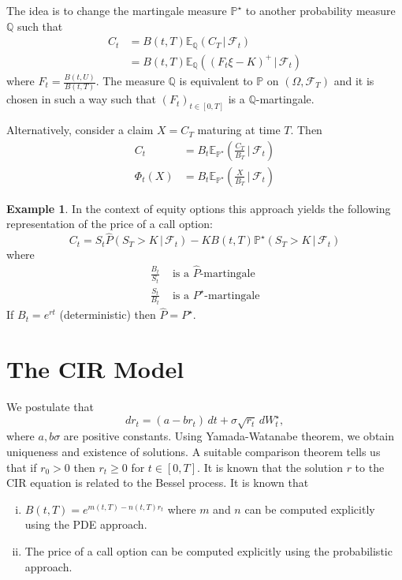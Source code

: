 \documentclass[10pt, oneside, reqno]{amsbook}
\theoremstyle{plain}%
\theoremstyle{definition}
\newtheorem{exmp}[thm]{Example}
\theoremstyle{remark}
\newcommand{\given}{ \, | \,}
\newcommand{\sigf}{\mathcal{F}}
\newcommand{\Q}{\mathbb{Q}}
\newcommand{\E}{\mathbb{E}}
\renewcommand{\P}{\mathbb{P}}
\numberwithin{equation}{chapter}
\begin{document}
The idea is to change the martingale measure $\P^\star$ to another probability measure $\Q$ such that \begin{align*}
    C_t &= B(t, T) \E_{\Q} \left(C_T \given \sigf_t \right) \\
    &= B(t, T) \E_{\Q} \left( \left(F_t \xi - K \right)^+ \given \sigf_t \right)
\end{align*} where $F_t = \frac{B(t, U)}{B(t, T)}$.  The measure $\Q$ is equivalent to $\P$ on $(\Omega, \sigf_T)$ and it is chosen in such a way such that $(F_t)_{t \in [0, T]}$ is a $\Q$-martingale.


Alternatively, consider a claim $X = C_T$ maturing at time $T$.  Then \begin{align*}
    C_t &= B_t \E_{\P^\star} \left( \frac{C_T}{B_T} \given \sigf_t \right) \\
    \Phi_t(X) &= B_t \E_{\P^\star} \left( \frac{X}{B_T} \given \sigf_t \right)
\end{align*}
\begin{exmp}
    In the context of equity options this approach yields the following representation of the price of a call option: \[
        C_t = S_t \hat P \left(S_T > K \given \sigf_t \right) - K B(t, T) \P^\star \left( S_T > K \given \sigf_t \right)
    \] 
    where \begin{align*}
        \frac{B_t}{S_t} &\text{ is a $\hat P$-martingale} \\
        \frac{S_t}{B_t} &\text{ is a $P^\star$-martingale}
    \end{align*}  If $B_t = e^{rt}$ (deterministic) then $\hat P =  P^\star$.
\end{exmp}

\section{The CIR Model} %
\label{sub:the_cir}
We postulate that \[
    dr_t = (a- b r_t) \, dt + \sigma \sqrt{r_t} \, dW^\star_t,
\]  where $a, b \sigma$ are positive constants.  Using Yamada-Watanabe theorem, we obtain uniqueness and existence of solutions.  A suitable comparison theorem tells us that if $r_0 > 0$ then $r_t \geq 0$ for $ t \in [ 0, T]$.  It is known that the solution $r$ to the CIR equation is related to the Bessel process.  It is known that \begin{enumerate}[(i)]
    \item $B(t, T) = e^{m(t, T) - n(t, T) r_t}$ where $m$ and $n$ can be computed explicitly using the PDE approach.  
    \item The price of a call option can be computed explicitly using the probabilistic approach.
\end{enumerate} 
\end{document}
